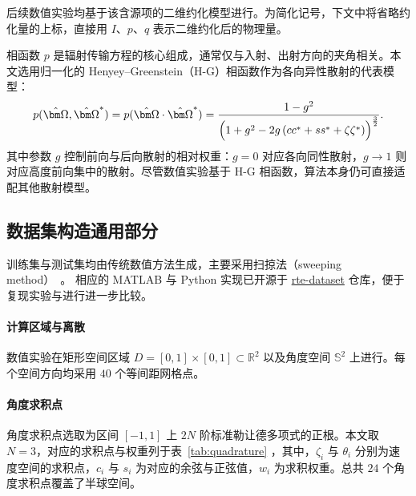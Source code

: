 后续数值实验均基于该含源项的二维约化模型进行。为简化记号，下文中将省略约化量的上标，直接用 $I$、$p$、$q$ 表示二维约化后的物理量。

相函数 $p$ 是辐射传输方程的核心组成，通常仅与入射、出射方向的夹角相关。本文选用归一化的 Henyey--Greenstein（H-G）相函数作为各向异性散射的代表模型：
\begin{equation}
    p(\bOmega,\bOmega^*) = p(\bOmega\cdot\bOmega^*) = \frac{1-g^2}{{\Bigl(1+g^2-2g\,(cc^*+ss^*+\zeta\zeta^*)\Bigr)}^{\frac{3}{2}}}.
\end{equation}
其中参数 $g$ 控制前向与后向散射的相对权重：$g=0$ 对应各向同性散射，$g\to 1$ 则对应高度前向集中的散射。尽管数值实验基于 H-G 相函数，算法本身仍可直接适配其他散射模型。

\subsection{数据集构造通用部分}\label{sec:dataset-construction}

训练集与测试集均由传统数值方法生成，主要采用扫掠法（sweeping method）~\cite{koch1991solution,zeyao2004parallel}。
相应的 MATLAB 与 Python 实现已开源于 \href{https://github.com/mazhengcn/rte-dataset}{rte-dataset} 仓库，便于复现实验与进行进一步比较。

\paragraph{计算区域与离散}
数值实验在矩形空间区域 $D = [0, 1]\times[0, 1]\subset \mathbb{R}^2$ 以及角度空间 $\mathbb{S}^{2}$ 上进行。每个空间方向均采用 $40$ 个等间距网格点。

\paragraph{角度求积点}
角度求积点选取为区间 $[-1,1]$ 上 $2N$ 阶标准勒让德多项式的正根。本文取 $N=3$，对应的求积点与权重列于表~\ref{tab:quadrature} ，其中，$\zeta_i$ 与 $\theta_i$ 分别为速度空间的求积点，$c_i$ 与 $s_i$ 为对应的余弦与正弦值，$w_i$ 为求积权重。总共 $24$ 个角度求积点覆盖了半球空间。

